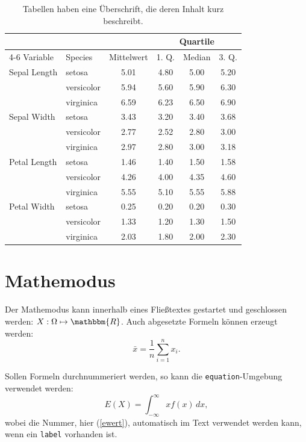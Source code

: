 \documentclass[
  fontsize=12pt,
  numbers=noenddot,
  parskip=half,
  listof=totoc,
  bibliography=totoc,
  headsepline=true,
  footsepline=false,
  DIV=12]{scrartcl}
\begin{document}
\begin{table}[h!]
  \caption{Tabellen haben eine Überschrift, die deren Inhalt kurz beschreibt.}
  \centering
  \begin{tabular}{llcccc}
    \toprule
             &         &            & \multicolumn{3}{c}{Quartile} \\\cmidrule(lr){4-6}
    Variable & Species & Mittelwert & 1. Q. & Median & 3. Q. \\
    \midrule
    Sepal Length & setosa     & 5.01 & 4.80 & 5.00 & 5.20 \\
                 & versicolor & 5.94 & 5.60 & 5.90 & 6.30 \\
                 & virginica  & 6.59 & 6.23 & 6.50 & 6.90 \\
    Sepal Width  & setosa     & 3.43 & 3.20 & 3.40 & 3.68 \\
                 & versicolor & 2.77 & 2.52 & 2.80 & 3.00 \\
                 & virginica  & 2.97 & 2.80 & 3.00 & 3.18 \\
    Petal Length & setosa     & 1.46 & 1.40 & 1.50 & 1.58 \\
                 & versicolor & 4.26 & 4.00 & 4.35 & 4.60 \\
                 & virginica  & 5.55 & 5.10 & 5.55 & 5.88 \\
    Petal Width  & setosa     & 0.25 & 0.20 & 0.20 & 0.30 \\
                 & versicolor & 1.33 & 1.20 & 1.30 & 1.50 \\
                 & virginica  & 2.03 & 1.80 & 2.00 & 2.30 \\
    \bottomrule
  \end{tabular}
  \label{tabelle}
\end{table}

\hypertarget{mathemodus}{%
\section{Mathemodus}\label{mathemodus}}

Der Mathemodus kann innerhalb eines Fließtextes gestartet und
geschlossen werden: \(X: \Omega \mapsto \mathbbm{R}\). Auch abgesetzte
Formeln können erzeugt werden: \[
  \bar{x} = \frac{1}{n} \sum_{i = 1}^n x_i .
\]

Sollen Formeln durchnummeriert werden, so kann die
\texttt{equation}-Umgebung verwendet werden: \begin{equation}
  E(X) = \int_{-\infty}^{\infty} x f(x)\, dx, \label{ewert}
\end{equation} wobei die Nummer, hier (\ref{ewert}), automatisch im Text
verwendet werden kann, wenn ein \texttt{label} vorhanden ist.
\end{document}
